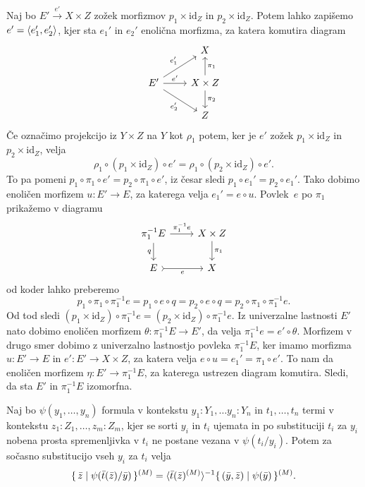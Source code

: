 \documentclass[../kategoricna_logika.tex]{subfiles}
\begin{document}
  \begin{dokaz}
    Naj bo $E' \xrightarrow{e'} X \times Z$ zožek morfizmov
    $p_1 \times \mathrm{id}_Z$ in $p_2 \times \mathrm{id}_Z$. Potem
    lahko zapišemo $e' = \langle e'_1, e'_2 \rangle$, kjer sta $e_1'$ in
    $e_2'$ enolična morfizma, za katera komutira diagram
    \begin{equation*}
      \begin{tikzcd}[row sep = normal]
        & X \\
        E' \ar[ur, "e_1'"] \ar[r, "e'"] \ar[dr, "e_2'"'] & X \times Z
        \ar[u, "\pi_1"'] \ar[d, "\pi_2"] \\
        & Z
      \end{tikzcd}
    \end{equation*}
    Če označimo projekcijo iz $Y \times Z$ na $Y$ kot
    $\rho_1$ potem, ker je $e'$ zožek $p_1 \times \mathrm{id}_Z$ in
    $p_2 \times \mathrm{id}_Z$, velja
    \[ \rho_1 \circ( p_1 \times \mathrm{id}_Z) \circ e' = \rho_1 \circ
     ( p_2 \times \mathrm{id}_Z) \circ e'.\] To pa pomeni
    $p_1 \circ \pi_1 \circ e' = p_2 \circ \pi_1 \circ e'$, iz česar
    sledi $p_1 \circ e_1' = p_2 \circ e_1'$. Tako dobimo enoličen
    morfizem $u : E' \to E$, za katerega velja $e_1' = e \circ
    u$. Povlek~$e$ po $\pi_1$ prikažemo v diagramu
    \begin{equation*}
      \begin{tikzcd}
        \pi_1^{-1}E \ar[d, "q"'] \ar[r, "\pi_1^{-1}e"] & X \times Z \ar[d, "\pi_1"] \\
        E \ar[r, tail, "e"'] & X
      \end{tikzcd}
    \end{equation*}
    od koder lahko preberemo
    \[ p_1 \circ \pi_1 \circ \pi_1^{-1}e = p_1 \circ e \circ q = p_2
      \circ e \circ q = p_2 \circ \pi_1 \circ \pi_1^{-1}e.\]
    Od tod sledi $(p_1 \times \mathrm{id}_Z) \circ \pi_1^{-1}e = (p_2 \times \mathrm{id}_Z) \circ \pi_1^{-1}e$.
    Iz univerzalne lastnosti $E'$ nato dobimo
    enoličen morfizem $\theta : \pi_1^{-1}E \to E'$, da velja
    $\pi_1^{-1}e = e' \circ \theta$.  Morfizem v drugo smer dobimo z
    univerzalno lastnostjo povleka $\pi_1^{-1}E$, ker imamo morfizma
    $u : E' \to E$ in $e' : E' \to X \times Z$, za katera velja
    $e \circ u = e_1' = \pi_1 \circ e'$. To nam da enoličen morfizem
    $\eta : E' \to \pi_1^{-1}E$, za katerega ustrezen diagram
    komutira.  Sledi, da sta $E'$ in $\pi_1^{-1}E$ izomorfna.
  \end{dokaz}
  \begin{lema}\label{lema:substitucija}
    Naj bo $\psi(y_1, \ldots, y_n)$ formula v kontekstu $y_1:Y_1, \ldots y_n:Y_n$
    in $t_1, \ldots, t_n$ termi v kontekstu
    $z_1:Z_1, \ldots, z_m:Z_m$, kjer se sorti $y_i$ in $t_i$ ujemata in po substituciji
    $t_i$ za $y_i$ nobena prosta spremenljivka v $t_i$ ne postane vezana v $\psi(t_i/y_i)$.
    Potem za sočasno substitucijo vseh $y_i$ za $t_i$ velja
    $$\lbrace\,\bar{z}  \mid  \psi(\bar{t}(\bar{z})/\bar{y})\,\rbrace^{(M)} =
  \langle \bar{t}(\bar{z})^{(M)}\rangle^{-1} \lbrace\,(\bar{y},\bar{z})  \mid \psi(\bar{y})\,\rbrace^{(M)}.$$
\end{lema}
\end{document}
